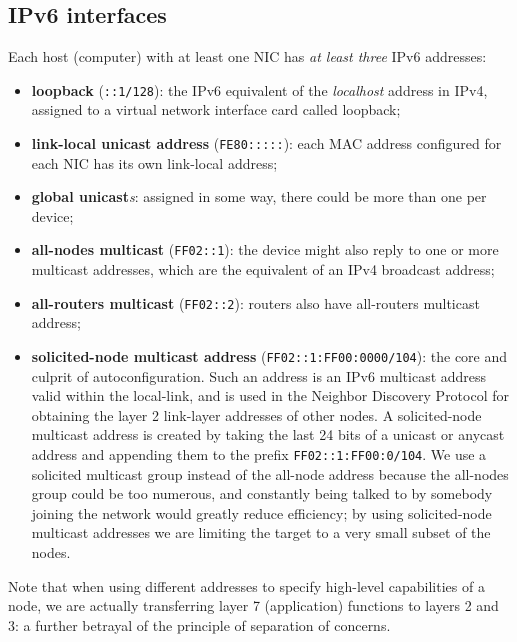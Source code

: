 
\subsection{IPv6 interfaces}
Each host (computer) with at least one NIC has \textit{at least three} IPv6 addresses:

\begin{itemize}
	\item \textbf{loopback} (\texttt{::1/128}): the IPv6 equivalent of the \textit{localhost} address in IPv4, assigned to a virtual network interface card called loopback;
	\item \textbf{link-local unicast address} (\texttt{FE80:::::}): each MAC address configured for each NIC has its own link-local address;
	\item \textbf{global unicast}\textit{s}: assigned in some way, there could be more than one per device;
	\item \textbf{all-nodes multicast} (\texttt{FF02::1}): the device might also reply to one or more multicast addresses, which are the equivalent of an IPv4 broadcast address;
	\item \textbf{all-routers multicast} (\texttt{FF02::2}): routers also have all-routers multicast address;
	\item \textbf{solicited-node multicast address} (\texttt{FF02::1:FF00:0000/104}): the core and culprit of autoconfiguration. Such an address is an IPv6 multicast address valid within the local-link, and is used in the Neighbor Discovery Protocol for obtaining the layer 2 link-layer addresses of other nodes. A solicited-node multicast address is created by taking the last 24 bits of a unicast or anycast address and appending them to the prefix \texttt{FF02::1:FF00:0/104}. We use a solicited multicast group instead of the all-node address because the all-nodes group could be too numerous, and constantly being talked to by somebody joining the network would greatly reduce efficiency; by using solicited-node multicast addresses we are limiting the target to a very small subset of the nodes.
\end{itemize}

Note that when using different addresses to specify high-level capabilities of a node, we are actually transferring layer 7 (application) functions to layers 2 and 3: a further betrayal of the principle of separation of concerns.

\vspace{0.5em}


